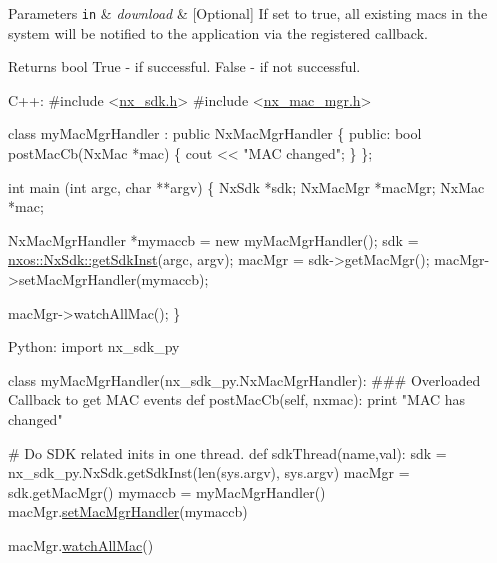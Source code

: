 \begin{DoxyParams}[1]{Parameters}
\mbox{\tt in}  & {\em download} & \mbox{[}Optional\mbox{]} If set to true, all existing macs in the system will be notified to the application via the registered callback.\\
\hline
\end{DoxyParams}
\begin{DoxyReturn}{Returns}
bool True -\/ if successful. False -\/ if not successful. 
\begin{DoxyCode}
C++:
\textcolor{preprocessor}{     #include <\mbox{\hyperlink{nx__sdk_8h}{nx\_sdk.h}}>}
\textcolor{preprocessor}{     #include <\mbox{\hyperlink{nx__mac__mgr_8h}{nx\_mac\_mgr.h}}>}

     \textcolor{keyword}{class }myMacMgrHandler : \textcolor{keyword}{public} NxMacMgrHandler \{
        \textcolor{keyword}{public}:
           \textcolor{keywordtype}{bool} postMacCb(NxMac *mac) \{
                cout << \textcolor{stringliteral}{"MAC changed"};
           \}
     \};

     \textcolor{keywordtype}{int}  main (\textcolor{keywordtype}{int} argc, \textcolor{keywordtype}{char} **argv)
     \{
          NxSdk    *sdk;
          NxMacMgr *macMgr;
          NxMac    *mac;

          NxMacMgrHandler *mymaccb = \textcolor{keyword}{new} myMacMgrHandler();
          sdk = \mbox{\hyperlink{classnxos_1_1_nx_sdk_a5050e2d26c40744b4fc7862068a83f39}{nxos::NxSdk::getSdkInst}}(argc, argv);
          macMgr = sdk->getMacMgr();
          macMgr->setMacMgrHandler(mymaccb);

          macMgr->watchAllMac();
     \}

Python:
   \textcolor{keyword}{import} nx\_sdk\_py

   \textcolor{keyword}{class }myMacMgrHandler(nx\_sdk\_py.NxMacMgrHandler):
\textcolor{preprocessor}{   ### Overloaded Callback to get MAC events}
         def postMacCb(self, nxmac):
             print "MAC has changed"

\textcolor{preprocessor}{   # Do SDK related inits in one thread.}
   def sdkThread(name,val):
       sdk = nx\_sdk\_py.NxSdk.getSdkInst(len(sys.argv), sys.argv)
       macMgr = sdk.getMacMgr()
       mymaccb = myMacMgrHandler()
       macMgr.\mbox{\hyperlink{classnxos_1_1_nx_mac_mgr_a06f53bd41ddb17e6cfaef5a02b00415d}{setMacMgrHandler}}(mymaccb)

       macMgr.\mbox{\hyperlink{classnxos_1_1_nx_mac_mgr_a5f4d2d56e21e3ae39969fa67774779d8}{watchAllMac}}()
\end{DoxyCode}
 
\end{DoxyReturn}
\mbox{\label{classnxos_1_1_nx_mac_mgr_a12dde38c22d9a27e1e3bde318d418134}} 
